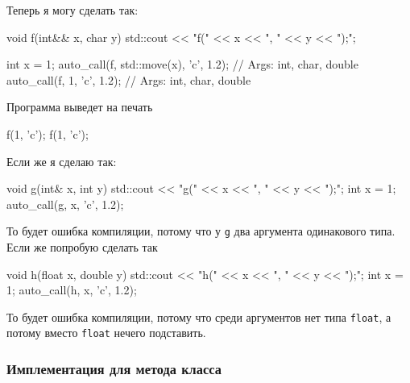 Теперь я могу сделать так:
\begin{cppcode}[\nonumbers]
void f(int&& x, char y) {
  std::cout << "f(" << x << ", " << y << ");\n";
}

int x = 1;
auto_call(f, std::move(x), 'c', 1.2); // Args: int, char, double
auto_call(f, 1, 'c', 1.2);            // Args: int, char, double
\end{cppcode}
Программа выведет на печать
\begin{cppcode}[\nonumbers]
f(1, 'c');
f(1, 'c');
\end{cppcode}
Если же я сделаю так:
\begin{cppcode}[\nonumbers]
void g(int& x, int y) {
  std::cout << "g(" << x << ", " << y << ");\n";
}
int x = 1;
auto_call(g, x, 'c', 1.2);
\end{cppcode}
То будет ошибка компиляции, потому что у \verb"g" два аргумента одинакового типа.
Если же попробую сделать так
\begin{cppcode}[\nonumbers]
void h(float x, double y) {
  std::cout << "h(" << x << ", " << y << ");\n";
}
int x = 1;
auto_call(h, x, 'c', 1.2);
\end{cppcode}
То будет ошибка компиляции, потому что среди аргументов нет типа \verb"float", а потому вместо \verb"float" нечего подставить.

\subsubsection{Имплементация для метода класса}


